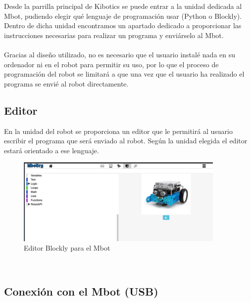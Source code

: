 \documentclass{report}
\begin{document}
Desde la parrilla principal de Kibotics se puede entrar a la unidad dedicada al Mbot, pudiendo elegir qué lenguaje de programación usar (Python o Blockly). Dentro de dicha unidad encontramos un apartado dedicado a proporcionar las instrucciones necesarias para realizar un programa y enviárselo al Mbot. 
\\
\\
Gracias al diseño utilizado, no es necesario que el usuario instalé nada en su ordenador ni en el robot para permitir su uso, por lo que el proceso de programación del robot se limitará a que una vez que el usuario ha realizado el programa se envié al robot directamente.

\subsection{Editor}

En la unidad del robot se proporciona un editor que le permitirá al usuario escribir el programa que será enviado al robot. Según la unidad elegida el editor estará orientado a ese lenguaje.
\\
\begin{figure}[h!]
  \centering
    \includegraphics[width=0.9\textwidth]{images/editor_mbot.png}
  \caption{Editor Blockly para el Mbot }
  \label{Editor Blockly para el Mbot }
\end{figure}
\\

\subsection{Conexión con el Mbot (USB)}
\end{document}
